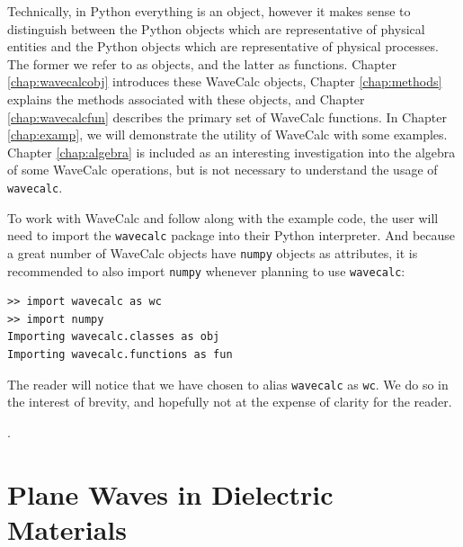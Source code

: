 \documentclass[11pt, reqno]{book}%
\newcounter{ct}
\newcommand{\tw}[1]{{\tt #1}}
\begin{document}
Technically, in Python everything is an object, however it makes sense to distinguish between the Python objects which are representative of physical entities and the Python objects which are representative of physical processes. The former we refer to as objects, and the latter as functions. Chapter \ref{chap:wavecalcobj} introduces these WaveCalc objects, Chapter \ref{chap:methods} explains the methods associated with these objects, and Chapter \ref{chap:wavecalcfun} describes the primary set of WaveCalc functions. In Chapter \ref{chap:examp}, we will demonstrate the utility of WaveCalc with some examples. Chapter \ref{chap:algebra} is included as an interesting investigation into the algebra of some WaveCalc operations, but is not necessary to understand the usage of \tw{wavecalc}.

To work with WaveCalc and follow along with the example code, the user will need to import the \tw{wavecalc} package into their Python interpreter. And because a great number of WaveCalc objects have \tw{numpy} objects as attributes, it is recommended to also import \tw{numpy} whenever planning to use \tw{wavecalc}:
\begin{verbatim}
>> import wavecalc as wc
>> import numpy
Importing wavecalc.classes as obj
Importing wavecalc.functions as fun
\end{verbatim}
\noindent The reader will notice that we have chosen to alias \tw{wavecalc} as \tw{wc}. We do so in the interest of brevity, and hopefully not at the expense of clarity for the reader. 















.








\chapter{Plane Waves in Dielectric Materials}
\label{chap:theory}
\end{document}
